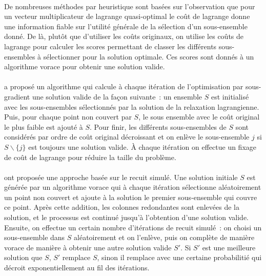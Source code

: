 \documentclass[12pt,letterpaper,twoside]{article}
\begin{document}
				\paragraph*{}
					De nombreuses méthodes par heuristique sont basées sur l'observation que pour un vecteur multiplicateur de lagrange quasi-optimal
					le coût de lagrange donne une information fiable sur l'utilité générale de la sélection d'un sous-ensemble donné.
					De là, plutôt que d'utiliser les coûts originaux, on utilise les coûts de lagrange pour calculer les scores permettant
					de classer les différents sous-ensembles à sélectionner pour la solution optimale. Ces scores sont donnés
					à un algorithme vorace pour obtenir une solution valide.~\cite{caprara2000algorithms}
				\paragraph*{}
					\citeauthor{Beasley1990} a proposé un algorithme qui calcule à chaque itération de l'optimisation par sous-gradient une
					solution valide de la façon suivante : un ensemble \(S\) est initialisé avec les sous-ensembles sélectionnés
					par la solution de la relaxation lagrangienne. Puis, pour chaque point non couvert par \(S\),
					le sous ensemble avec le coût original le plus faible est ajouté à \(S\). Pour finir, les différents sous-ensembles
					de \(S\) sont considérés par ordre de coût original décroissant et on enlève le sous-ensemble \(j\) si \(S \backslash \{j\}\)
					est toujours une solution valide. À chaque itération on effectue un fixage de coût de lagrange pour réduire la taille
					du problème.~\cite{Beasley1990}	
				\paragraph*{}
					\citeauthor{jacobs1995lsh} ont proposée une approche basée sur le recuit simulé. Une solution initiale \(S\)
					est générée par un algorithme vorace qui à chaque itération sélectionne aléatoirement un point non couvert
					et ajoute à la solution le premier sous-ensemble qui couvre ce point. Après cette addition, les colonnes
					redondantes sont enlevées de la solution, et le processus est continué jusqu'à l'obtention d'une solution valide.
					Ensuite, on effectue un certain nombre d'itérations de recuit simulé : on choisi un sous-ensemble dans \(S\) aléatoirement
					et on l'enlève, puis on complète de manière vorace de manière à obtenir une autre solution valide \(S'\). Si \(S'\)
					est une meilleure solution que \(S\), \(S'\) remplace \(S\), sinon il remplace avec une certaine probabilitié qui
					décroit exponentiellement au fil des itérations.~\cite{jacobs1995lsh}
\end{document}

